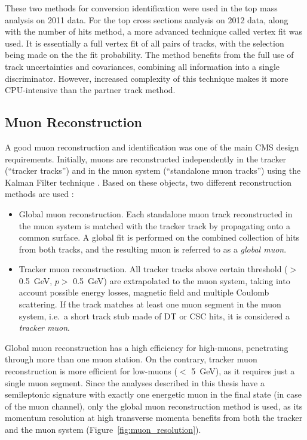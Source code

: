 These two methods for conversion identification were used in the top mass analysis on 2011 data. For the top cross
sections analysis on 2012 data, along with the number of hits method, a more advanced technique called vertex fit was
used. It is essentially a full vertex fit of all pairs of tracks, with the selection being made on the the fit
probability. The method benefits from the full use of track uncertainties and covariances, combining all information
into a single discriminator. However, increased complexity of this technique makes it more CPU-intensive than the
partner track method.


\subsection{Muon Reconstruction}
\label{ss:muon_reconstruction}
A good muon reconstruction and identification was one of the main CMS design requirements. Initially, muons are
reconstructed independently in the tracker (``tracker tracks'') and in the muon system (``standalone muon tracks'')
using the Kalman Filter technique \autocite{KF}. Based on these objects, two different reconstruction methods are used
\autocite{muon_reconstruction}:

\begin{itemize}
  \item Global muon reconstruction. Each standalone muon track reconstructed in the muon system is matched with the
  tracker track by propagating onto a common surface. A global fit is performed on the combined collection of hits from
  both tracks, and the resulting muon is referred to as a \textit{global muon}.
  \item Tracker muon reconstruction. All tracker tracks above certain threshold (\pt $>$ \SI{0.5}{\GeV}, $p >$
  \SI{0.5}{\GeV}) are extrapolated to the muon system, taking into account possible energy losses, magnetic field and
  multiple Coulomb scattering. If the track matches at least one muon segment in the muon system, i.e.\ a short track
  stub made of DT or CSC hits, it is considered a \textit{tracker muon}.
\end{itemize}

Global muon reconstruction has a high efficiency for high-\pt muons, penetrating through more than one muon station. On
the contrary, tracker muon reconstruction is more efficient for low-\pt muons (\pt $<$ \SI{5}{\GeV}), as it requires
just a single muon segment. Since the \ttbar analyses described in this thesis have a semileptonic signature with
exactly one energetic muon in the final state (in case of the muon channel), only the global muon reconstruction method
is used, as its momentum resolution at high transverse momenta benefits from both the tracker and the muon system
(Figure~\ref{fig:muon_resolution}).

